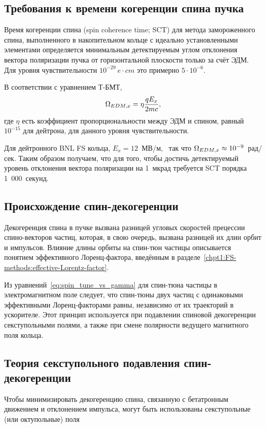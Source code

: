 
\newcommand{\Tlmsq}{Тл/м$^2$ }

\subsection{Требования к времени когеренции спина пучка}
Время когеренции спина (spin coherence time; SCT) для метода
замороженного спина, выполненного в накопительном кольце с идеально
установленными элементами определяется минимальным детектируемым углом
отклонения вектора поляризации пучка от горизонтальной плоскости
только за счёт ЭДМ. Для уровня чувствительности $10^{-29}~e\cdot cm$
это примерно $5\cdot10^{-6}$.~\cite{BNL:Deuteron2008}

В соответствии с уравнением Т-БМТ,
\[
\Omega_{EDM,x} = \eta\frac{qE_x}{2mc},
\]
где $\eta$ есть коэффициент пропорциональности между ЭДМ и спином,
равный $10^{-15}$ для дейтрона, для данного уровня чувствительности.~\cite[стр.~206]{Eremey:Thesis}

Для дейтронного BNL FS кольца, ${E_x = 12}$~МВ/м,~\cite[стр.~19]{BNL:Deuteron2008} 
так что ${\Omega_{EDM,x}\approx10^{-9}}$~рад/сек. 
Таким образом получаем, что для того, чтобы достичь
детектируемый уровень отклонения вектора поляризации на 1~мкрад требуется SCT порядка 1~000~секунд.~\cite[стр.~207]{Eremey:Thesis}
\subsection{Происхождение спин-декогеренции}\label{sec:decoh:origin}
Декогеренция спина в пучке вызвана разницей угловых скоростей
прецессии спино-векторов частиц, которая, в свою очередь, вызвана разницей
их длин орбит и импульсов. Влияние длины орбиты на спин-тюн частицы описывается 
понятием эффективного Лоренц-фактора, введённым в разделе~\ref{chpt1:FS-methods:effective-Lorentz-factor}.

Из уравнений~\eqref{eq:spin_tune_vs_gamma} для спин-тюна частицы в электромагнитном поле следует, 
что спин-тюны двух частиц с одинаковыми эффективными Лоренц-факторами равны, независимо от их траекторий в ускорителе. Этот принцип используется при подавлении спиновой декогеренции секступольными полями, а также при смене полярности ведущего магнитного поля кольца.

\subsection{Теория секступольного подавления спин-декогеренции}\label{sec:sextupole_spin_dec_solution}
Чтобы минимизировать декогеренцию спина, связанную с бетатронным
движением и отклонением импульса, могут быть использованы
секступольные (или октупольные) поля~\cite[стр.~212]{Eremey:Thesis}

